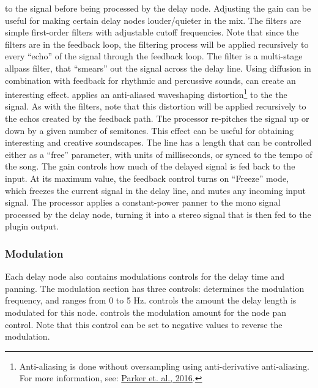 \documentclass[landscape,twocolumn,a5paper]{manual}
\begin{document}
to the signal before being processed by the delay
node. Adjusting the gain can be useful for making
certain delay nodes louder/quieter in the mix.
\newpar
The  filters are simple
first-order filters with adjustable cutoff frequencies.
Note that since the filters are in the feedback loop,
the filtering process will be applied recursively to every
``echo'' of the signal through the feedback loop.
\newpar
The  filter is a multi-stage allpass
filter, that ``smears'' out the signal across the delay line.
Using diffusion in combination with feedback for rhythmic
and percussive sounds, can create an interesting effect.
\newpar
{} applies an anti-aliased waveshaping
distortion\footnote{Anti-aliasing is done without oversampling using anti-derivative anti-aliasing. For more information, see: \href{http://dafx16.vutbr.cz/dafxpapers/20-DAFx-16_paper_41-PN.pdf}{Parker et. al., 2016}.}
to the the signal. As with the filters, note that this
distortion will be applied recursively to the echos created
by the feedback path.
\newpar
The  processor re-pitches the signal up
or down by a given number of semitones. This effect can be
useful for obtaining interesting and creative soundscapes.
\newpar
The  line has a length that can be
controlled either as a ``free'' parameter, with units
of milliseconds, or synced to the tempo of the song.
\newpar
The  gain controls how much of the
delayed signal is fed back to the input. At its maximum
value, the feedback control turns on ``Freeze'' mode, which
freezes the current signal in the delay line, and mutes
any incoming input signal.
\newpar
The  processor applies a constant-power
panner to the mono signal processed by the delay node,
turning it into a stereo signal that is then fed to the
plugin output.

\subsubsection{Modulation}
Each delay node also contains modulations controls for the
delay time and panning. The modulation section has three
controls:
\newpar
{} determines the modulation frequency,
and ranges from 0 to 5 Hz.
 controls the amount the delay length
is modulated for this node.
 controls the modulation amount for
the node pan control. Note that this control can be
set to negative values to reverse the modulation.
\end{document}
